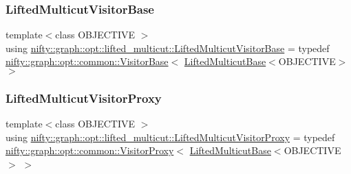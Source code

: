 \mbox{\label{namespacenifty_1_1graph_1_1opt_1_1lifted__multicut_a3350124f8869505fecf39d697b9b2718}} 
\subsubsection{\texorpdfstring{Lifted\+Multicut\+Visitor\+Base}{LiftedMulticutVisitorBase}}
{\footnotesize\ttfamily template$<$class O\+B\+J\+E\+C\+T\+I\+VE $>$ \\
using \hyperlink{namespacenifty_1_1graph_1_1opt_1_1lifted__multicut_a3350124f8869505fecf39d697b9b2718}{nifty\+::graph\+::opt\+::lifted\+\_\+multicut\+::\+Lifted\+Multicut\+Visitor\+Base} = typedef \hyperlink{classnifty_1_1graph_1_1opt_1_1common_1_1VisitorBase}{nifty\+::graph\+::opt\+::common\+::\+Visitor\+Base}$<$ \hyperlink{classnifty_1_1graph_1_1opt_1_1lifted__multicut_1_1LiftedMulticutBase}{Lifted\+Multicut\+Base}$<$O\+B\+J\+E\+C\+T\+I\+VE$>$ $>$}

\mbox{\label{namespacenifty_1_1graph_1_1opt_1_1lifted__multicut_a2b56d863219c7b968e884cc86a4e56a7}} 
\subsubsection{\texorpdfstring{Lifted\+Multicut\+Visitor\+Proxy}{LiftedMulticutVisitorProxy}}
{\footnotesize\ttfamily template$<$class O\+B\+J\+E\+C\+T\+I\+VE $>$ \\
using \hyperlink{namespacenifty_1_1graph_1_1opt_1_1lifted__multicut_a2b56d863219c7b968e884cc86a4e56a7}{nifty\+::graph\+::opt\+::lifted\+\_\+multicut\+::\+Lifted\+Multicut\+Visitor\+Proxy} = typedef \hyperlink{classnifty_1_1graph_1_1opt_1_1common_1_1VisitorProxy}{nifty\+::graph\+::opt\+::common\+::\+Visitor\+Proxy}$<$ \hyperlink{classnifty_1_1graph_1_1opt_1_1lifted__multicut_1_1LiftedMulticutBase}{Lifted\+Multicut\+Base}$<$O\+B\+J\+E\+C\+T\+I\+VE$>$ $>$}

